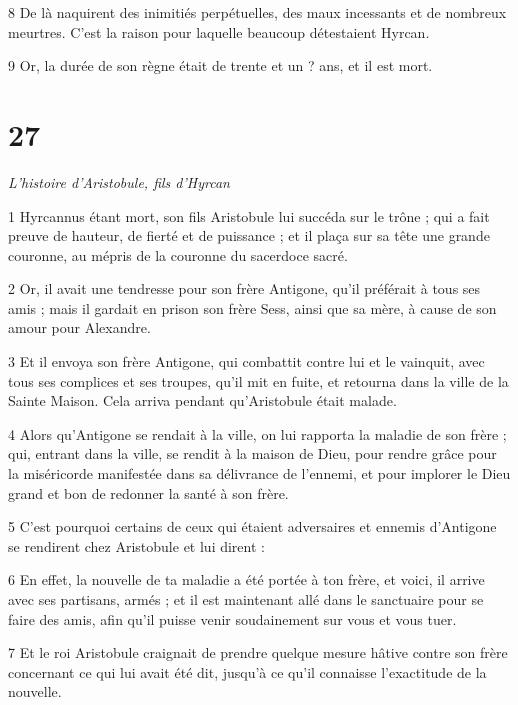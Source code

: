 \par 8 De là naquirent des inimitiés perpétuelles, des maux incessants et de nombreux meurtres. C’est la raison pour laquelle beaucoup détestaient Hyrcan.

\par 9 Or, la durée de son règne était de trente et un ? ans, et il est mort.

\chapter{27}

\par \textit{L'histoire d'Aristobule, fils d'Hyrcan}

\par 1 Hyrcannus étant mort, son fils Aristobule lui succéda sur le trône ; qui a fait preuve de hauteur, de fierté et de puissance ; et il plaça sur sa tête une grande couronne, au mépris de la couronne du sacerdoce sacré.

\par 2 Or, il avait une tendresse pour son frère Antigone, qu'il préférait à tous ses amis ; mais il gardait en prison son frère Sess, ainsi que sa mère, à cause de son amour pour Alexandre.

\par 3 Et il envoya son frère Antigone, qui combattit contre lui et le vainquit, avec tous ses complices et ses troupes, qu'il mit en fuite, et retourna dans la ville de la Sainte Maison. Cela arriva pendant qu'Aristobule était malade.

\par 4 Alors qu'Antigone se rendait à la ville, on lui rapporta la maladie de son frère ; qui, entrant dans la ville, se rendit à la maison de Dieu, pour rendre grâce pour la miséricorde manifestée dans sa délivrance de l'ennemi, et pour implorer le Dieu grand et bon de redonner la santé à son frère.

\par 5 C'est pourquoi certains de ceux qui étaient adversaires et ennemis d'Antigone se rendirent chez Aristobule et lui dirent :

\par 6 En effet, la nouvelle de ta maladie a été portée à ton frère, et voici, il arrive avec ses partisans, armés ; et il est maintenant allé dans le sanctuaire pour se faire des amis, afin qu'il puisse venir soudainement sur vous et vous tuer.

\par 7 Et le roi Aristobule craignait de prendre quelque mesure hâtive contre son frère concernant ce qui lui avait été dit, jusqu'à ce qu'il connaisse l'exactitude de la nouvelle.

